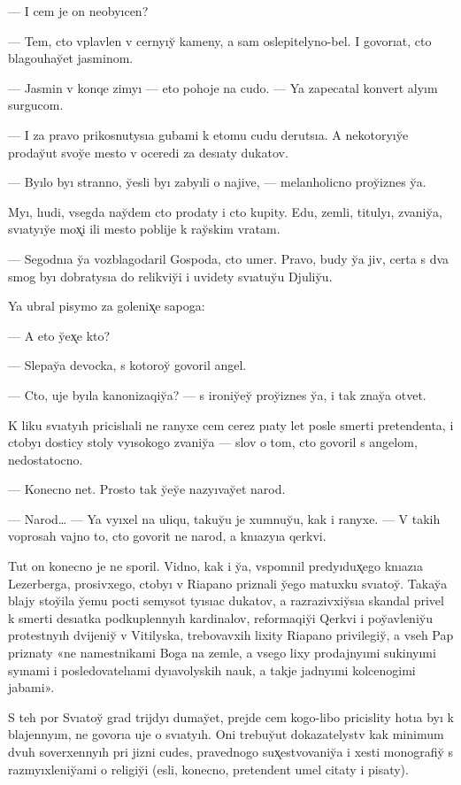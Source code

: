 \documentclass[10pt]{book}
\begin{document}
— I cem je on neobyıcen?

— Tem, cto vplavlen v cernyıy̆ kameny, a sam oslepitelyno-bel. I govorıat, cto blagouhay̆et jasminom.

— Jasmin v konqe zimyı — eto pohoje na cudo. — Ya zapecatal konvert alyım surgucom.

— I za pravo prikosnutysıa gubami k etomu cudu derutsıa. A nekotoryıy̆e proday̆ut svoy̆e mesto v oceredi za desıaty dukatov.

— Byılo byı stranno, y̆esli byı zabyıli o najive, — melanholicno proy̆iznes y̆a.

Myı, lıudi, vsegda nay̆dem cto prodaty i cto kupity. Edu, zemli, titulyı, zvaniy̆a, svıatyıy̆e mox̨i ili mesto poblije k ray̆skim vratam.

— Segodnıa y̆a vozblagodaril Gospoda, cto umer. Pravo, budy y̆a jiv, certa s dva smog byı dobratysıa do relikviy̆i i uvidety svıatuy̆u Djuliy̆u.

Ya ubral pisymo za golenix̨e sapoga:

— A eto y̆ex̨e kto?

— Slepay̆a devocka, s kotoroy̆ govoril angel.

— Cto, uje byıla kanonizaqiy̆a? — s ironiy̆ey̆ proy̆iznes y̆a, i tak znay̆a otvet.

K liku svıatyıh pricislıali ne ranyxe cem cerez pıaty let posle smerti pretendenta, i ctobyı dosticy stoly vyısokogo zvaniy̆a — slov o tom, cto govoril s angelom, nedostatocno.

— Konecno net. Prosto tak y̆ey̆e nazyıvay̆et narod.

— Narod… — Ya vyıxel na uliqu, takuy̆u je xumnuy̆u, kak i ranyxe. — V takih voprosah vajno to, cto govorit ne narod, a knıazyıa qerkvi.

Tut on konecno je ne sporil. Vidno, kak i y̆a, vspomnil predyıdux̨ego knıazıa Lezerberga, prosivxego, ctobyı v Riapano priznali y̆ego matuxku svıatoy̆. Takay̆a blajy stoy̆ila y̆emu pocti semysot tyısıac dukatov, a razrazivxiy̆sıa skandal privel k smerti desıatka podkuplennyıh kardinalov, reformaqiy̆i Qerkvi i poy̆avleniy̆u protestnyıh dvijeniy̆ v Vitilyska, trebovavxih lixity Riapano privilegiy̆, a vseh Pap priznaty «ne namestnikami Boga na zemle, a vsego lixy prodajnyımi sukinyımi syınami i posledovatelıami dyıavolyskih nauk, a takje jadnyımi kolcenogimi jabami».

S teh por Svıatoy̆ grad trijdyı dumay̆et, prejde cem kogo-libo pricislity hotıa byı k blajennyım, ne govorıa uje o svıatyıh. Oni trebuy̆ut dokazatelystv kak minimum dvuh soverxennyıh pri jizni cudes, pravednogo sux̨estvovaniy̆a i xesti monografiy̆ s razmyıxleniy̆ami o religiy̆i (esli, konecno, pretendent umel citaty i pisaty).
\end{document}

